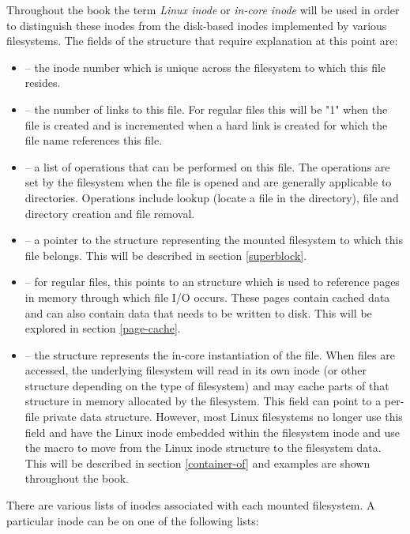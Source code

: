 \noindent
Throughout the book the term \textit{Linux inode} or \textit{in-core inode} will be used in order to distinguish these inodes from the disk-based inodes implemented by various filesystems. The fields of the  structure that require explanation at this point are:

\begin{itemize}
	\item {} -- the inode number which is unique across the filesystem to which this file resides.
	\item {} -- the number of links to this file. For regular files this will be "1" when the file is created and is
		incremented when a hard link is created for which the file name references this file.
	\item {} -- a list of operations that can be performed on this file. The operations are set by
		the filesystem when the file is opened and are generally applicable to directories. Operations include
		lookup (locate a file in the directory), file and directory creation and file removal. 
	\item {} -- a pointer to the  structure representing the mounted filesystem 
		to which this file belongs. This will be described in section \ref{superblock}.
	\item {} -- for regular files, this points to an  structure which is used
		to reference pages in memory through which file I/O occurs. These pages contain cached data and can also
		contain data that needs to be written to disk. This will be explored in section \ref{page-cache}.
	\item {} -- the  structure represents the in-core instantiation of the file. When files are accessed, the 
		underlying filesystem will read in its own inode (or other structure depending on the type of filesystem) and may
		cache parts of that structure in memory allocated by the filesystem. This field can point to a per-file private 
		data structure. However, most Linux filesystems no longer use this field and have the Linux inode embedded 
		within the filesystem inode and use the  macro to move from the Linux inode structure to 
		the filesystem data. This will be described in section \ref{container-of} and examples are shown throughout the book.
\end{itemize}

\noindent
There are various lists of inodes associated with each mounted filesystem. A particular inode can be on one of the following lists:

